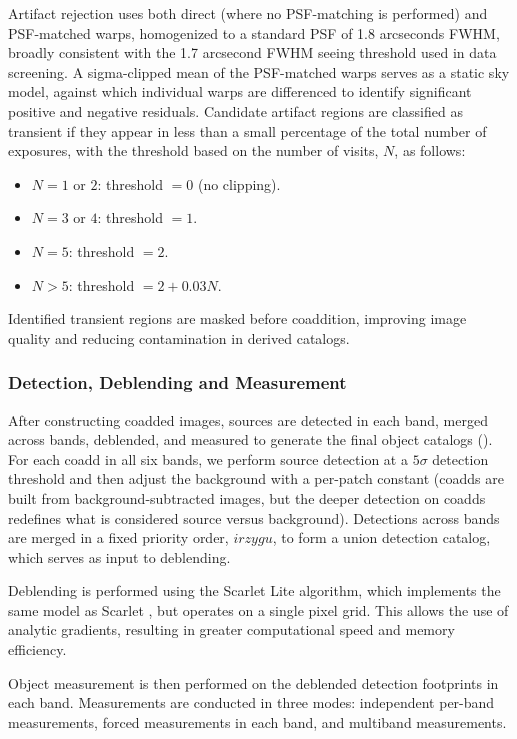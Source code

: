 Artifact rejection uses both direct (where no PSF-matching is performed) and PSF-matched warps, homogenized to a standard PSF of 1.8 arcseconds FWHM, broadly consistent with the 1.7 arcsecond FWHM \gls{seeing} threshold used in data screening.
A sigma-clipped mean of the \gls{PSF}-matched warps serves as a static sky model, against which individual warps are differenced to identify significant positive and negative residuals.
Candidate artifact regions are classified as \gls{transient} if they appear in less than a small percentage of the total number of exposures, with the threshold  based on the number of visits, $N$,  as follows:
\begin{itemize}
    \item $N=1$ or $2$: threshold $= 0$ (no clipping).
    \item $N=3$ or $4$: threshold $= 1$.
    \item $N=5$: threshold $= 2$.
    \item $N>5$: threshold $= 2+0.03N$.
\end{itemize}
Identified \gls{transient} regions are masked before coaddition, improving image quality and reducing contamination in derived catalogs.

\subsubsection{Detection, Deblending and Measurement}
\label{sssec:coadd_processing}
After constructing coadded images, sources are detected in each band, merged across bands, deblended, and measured to generate the final object catalogs  ().
For each coadd in all six bands, we perform source detection at a $5\sigma$ detection threshold and then adjust the background with a per-patch constant (coadds are built from background-subtracted images, but the deeper detection on coadds redefines what is considered source versus background).
Detections across bands are merged in a fixed priority order, $irzygu$, to form a union detection catalog, which serves as input to deblending.

Deblending is performed using the Scarlet Lite algorithm, which implements the same model as Scarlet \citep{2018A&C....24..129M}, but operates on a single pixel grid.
This allows the use of analytic gradients, resulting in greater computational speed and memory efficiency.

\gls{Object} measurement is then performed on the deblended detection footprints in each band.
Measurements are conducted in three modes: independent per-band measurements, forced measurements in each band, and multiband measurements.

